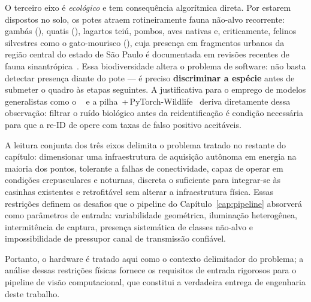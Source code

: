 O terceiro eixo é \emph{ecológico} e tem consequência algorítmica direta. Por estarem dispostos no solo, os potes atraem rotineiramente fauna não-alvo recorrente: gambás (), quatis (), lagartos teiú, pombos, aves nativas e, criticamente, felinos silvestres como o gato-mourisco (), cuja presença em fragmentos urbanos da região central do estado de São Paulo é documentada em revisões recentes de fauna sinantrópica~\cite{goncalves2025wildcat,cove2022capital}. Essa biodiversidade altera o problema de software: não basta detectar presença diante do pote --- é preciso \textbf{discriminar a espécie} antes de submeter o quadro às etapas seguintes. A justificativa para o emprego de modelos generalistas como o \modeloSN~\cite{google_speciesnet_blog} e a pilha \modeloMD\,+\,PyTorch-Wildlife~\cite{hernandez2024pytorchwildlife,microsoft_cameratraps_repo} deriva diretamente dessa observação: filtrar o ruído biológico antes da reidentificação é condição necessária para que a re-ID de  opere com taxas de falso positivo aceitáveis.

A leitura conjunta dos três eixos delimita o problema tratado no restante do capítulo: dimensionar uma infraestrutura de aquisição autônoma em energia na maioria dos pontos, tolerante a falhas de conectividade, capaz de operar em condições crepusculares e noturnas, discreta o suficiente para integrar-se às casinhas existentes e retrofitável sem alterar a infraestrutura física. Essas restrições definem os desafios que o pipeline do Capítulo~\ref{cap:pipeline} absorverá como parâmetros de entrada: variabilidade geométrica, iluminação heterogênea, intermitência de captura, presença sistemática de classes não-alvo e impossibilidade de pressupor canal de transmissão confiável.

Portanto, o hardware é tratado aqui como o contexto delimitador do problema; a análise dessas restrições físicas fornece os requisitos de entrada rigorosos para o pipeline de visão computacional, que constitui a verdadeira entrega de engenharia deste trabalho.